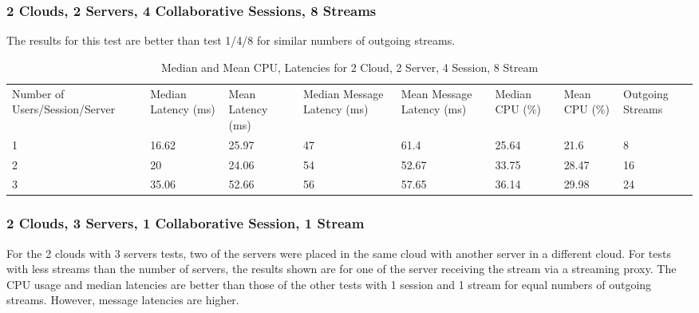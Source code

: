 \clearpage\subsubsection{2 Clouds, 2 Servers, 4 Collaborative Sessions, 8 Streams}

The results for this test are better than test 1/4/8 for similar numbers of outgoing streams.

\begin{table}
\caption{Median and Mean CPU, Latencies for 2 Cloud, 2 Server, 4 Session, 8 Stream}
\label{table:2cld_2serv_4sess_8str}
\begin{tabu} to\linewidth{|X[c]|X[c]|X[c]|X[c]|X[c]|X[c]|X[c]|X[c]|}
\everyrow{\hline}
\hline
Number of Users/Session/Server & Median Latency (ms) & Mean Latency (ms) & Median Message Latency (ms) & Mean Message Latency (ms) & Median CPU (\%) & Mean CPU (\%) & Outgoing Streams\\
1 & 16.62 & 25.97 & 47 & 61.4 & 25.64 & 21.6 & 8 \\
2 & 20 & 24.06 & 54 & 52.67 & 33.75 & 28.47 & 16 \\
3 & 35.06 & 52.66 & 56 & 57.65 & 36.14 & 29.98 & 24 \\
\end{tabu}
\end{table}

\clearpage\subsubsection{2 Clouds, 3 Servers, 1 Collaborative Session, 1 Stream}

For the 2 clouds with 3 servers tests, two of the servers were placed in the same cloud with another server in a different cloud. For tests with less streams than the number of servers, the results shown are for one of the server receiving the stream via a streaming proxy. The CPU usage and median latencies are better than those of the other tests with 1 session and 1 stream for equal numbers of outgoing streams. However, message latencies are higher.

